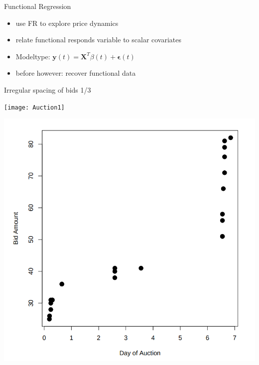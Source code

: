 \documentclass[hyperref={pdfpagelabels=false}]{beamer}
\begin{document}
\begin{frame}{Functional Regression}
\begin{itemize}
	\item use FR to explore price dynamics
	\item relate functional responds variable to scalar covariates
	\item Modeltype: $\mathbf{y}(t)=\mathbf{X}^T\beta(t)+\mathbf{\epsilon}(t)$ %
	\item before however: recover functional data
\end{itemize}
\end{frame}

\begin{frame}{Irregular spacing of bids 1/3}
\centering
\begin{minipage}[c]{0.6\textwidth}
\texttt{[image: Auction1]}
\end{minipage}
\begin{minipage}[c]{0.6\textwidth}
\includegraphics[width=\textwidth]{Auction2}
\end{minipage}
\end{frame}
\end{document}
